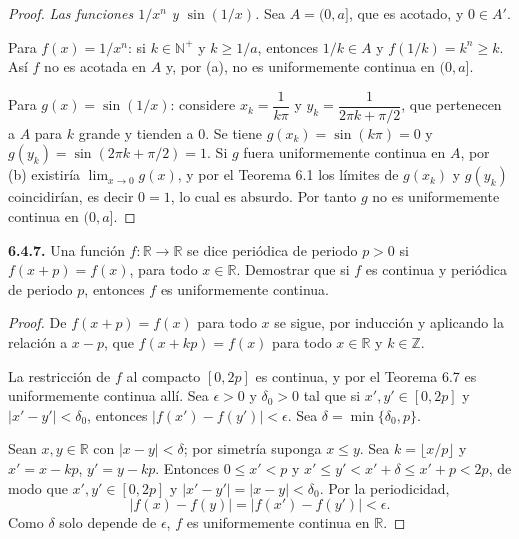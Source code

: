 \documentclass[11pt]{article}
\newcommand{\R}{\mathbb{R}}
\newcommand{\N}{\mathbb{N}}
\begin{document}
\begin{proof}
  \emph{Las funciones $1/x^n$ y $\sin(1/x)$.} Sea $A=(0,a]$, que es acotado, y $0\in A'$.

  Para $f(x)=1/x^n$: si $k\in\N^+$ y $k\ge 1/a$, entonces $1/k\in A$ y $f(1/k)=k^n\ge k$. Así $f$ no es acotada en $A$ y, por (a), no es uniformemente continua en $(0,a]$.

  Para $g(x)=\sin(1/x)$: considere $x_k=\dfrac{1}{k\pi}$ y $y_k=\dfrac{1}{2\pi k+\pi/2}$, que pertenecen a $A$ para $k$ grande y tienden a $0$. Se tiene $g(x_k)=\sin(k\pi)=0$ y $g(y_k)=\sin(2\pi k+\pi/2)=1$. Si $g$ fuera uniformemente continua en $A$, por (b) existiría $\lim_{x\to 0}g(x)$, y por el Teorema 6.1 los límites de $g(x_k)$ y $g(y_k)$ coincidirían, es decir $0=1$, lo cual es absurdo. Por tanto $g$ no es uniformemente continua en $(0,a]$.
  \end{proof}

  \textbf{6.4.7.} Una función $f:\R\to\R$ se dice periódica de periodo $p>0$ si $f(x+p)=f(x)$, para todo $x\in\R$. Demostrar que si $f$ es continua y periódica de periodo $p$, entonces $f$ es uniformemente continua.

  \begin{proof}
  De $f(x+p)=f(x)$ para todo $x$ se sigue, por inducción y aplicando la relación a $x-p$, que $f(x+kp)=f(x)$ para todo $x\in\R$ y $k\in\mathbb Z$.

  La restricción de $f$ al compacto $[0,2p]$ es continua, y por el Teorema 6.7 es uniformemente continua allí. Sea $\epsilon>0$ y $\delta_0>0$ tal que si $x',y'\in[0,2p]$ y $|x'-y'|<\delta_0$, entonces $|f(x')-f(y')|<\epsilon$. Sea $\delta=\min\{\delta_0,p\}$.

  Sean $x,y\in\R$ con $|x-y|<\delta$; por simetría suponga $x\le y$. Sea $k=\lfloor x/p\rfloor$ y $x'=x-kp$, $y'=y-kp$. Entonces $0\le x'<p$ y $x'\le y'<x'+\delta\le x'+p<2p$, de modo que $x',y'\in[0,2p]$ y $|x'-y'|=|x-y|<\delta_0$. Por la periodicidad,
  \[
  |f(x)-f(y)|=|f(x')-f(y')|<\epsilon.
  \]
  Como $\delta$ solo depende de $\epsilon$, $f$ es uniformemente continua en $\R$.
  \end{proof}
\end{document}

